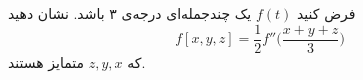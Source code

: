 فرض کنید 
\(f(t)\)
یک چندجمله‌ای درجه‌ی ۳ باشد. نشان دهید
\[f[x,y,z] = \frac{1}{2} f''\Big(\frac{x+y+z}{3}\Big)\]
 که
\(z,y,x\)
متمایز هستند.

